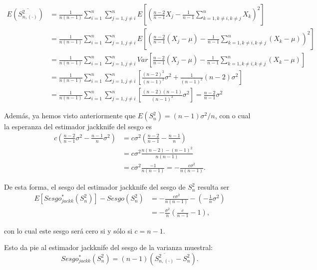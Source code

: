 \documentclass[
]{book}
\theoremstyle{break}
\theoremstyle{nonumberplain}
\begin{document}
\[\begin{aligned}
E\left( \overline{S_{n,(\cdot)}^2} \right) 
&=\frac{1}{n\left(
n-1 \right)}\sum_{i=1}^{n}\sum_{j=1,j\neq i}^{n}E\left[ \left( \frac{n-2}{n-1
}X_j-\frac{1}{n-1}\sum_{k=1,k\neq i,k\neq j}^{n}X_{k} \right)^2\right] \\
&=\frac{1}{n\left( n-1 \right)}\sum_{i=1}^{n}\sum_{j=1,j\neq i}^{n}E\left[
\left( \frac{n-2}{n-1}\left( X_j-\mu \right) -\frac{1}{n-1}\sum_{k=1,k\neq
i,k\neq j}^{n}\left( X_{k}-\mu \right) \right)^2\right] \\
&=\frac{1}{n\left( n-1 \right)}\sum_{i=1}^{n}\sum_{j=1,j\neq i}^{n}Var\left[ 
\frac{n-2}{n-1}\left( X_j-\mu \right) -\frac{1}{n-1}\sum_{k=1,k\neq
i,k\neq j}^{n}\left( X_{k}-\mu \right) \right] \\
&=\frac{1}{n\left( n-1 \right)}\sum_{i=1}^{n}\sum_{j=1,j\neq i}^{n}\left[ 
\frac{\left( n-2 \right)^2}{\left( n-1 \right)^2}\sigma^2+\frac{1}{
\left( n-1 \right)^2}\left( n-2 \right) \sigma^2\right] \\
&=\frac{1}{n\left( n-1 \right)}\sum_{i=1}^{n}\sum_{j=1,j\neq i}^{n}\left[ 
\frac{\left( n-2 \right) \left( n-1 \right)}{\left( n-1 \right)^2}\sigma
^2\right] =\frac{n-2}{n-1}\sigma^2
\end{aligned}\]

Además, ya hemos visto anteriormente que \(E\left( S_n^2 \right) = (n-1)\sigma^2/n\), con o cual la esperanza del estimador jackknife del sesgo es
\[\begin{aligned}
c\left( \frac{n-2}{n-1}\sigma^2-\frac{n-1}{n}\sigma^2 \right)
&= c\sigma^2\left( \frac{n-2}{n-1}-\frac{n-1}{n} \right) \\
&= c\sigma^2\frac{n\left( n-2 \right) -\left( n-1 \right)^2}{n\left( n-1 \right)} \\
&= c\sigma^2\frac{-1}{n\left( n-1 \right)}
=-\frac{c\sigma^2}{n\left(n-1 \right)}.
\end{aligned}\]

De esta forma, el sesgo del estimador jackknife del sesgo de \(S_n^2\)
resulta ser
\[\begin{aligned}
E\left[ Sesgo_{jackk}^{\ast}\left( S_n^2 \right) \right] 
-Sesgo\left(S_n^2 \right) &= -\frac{c\sigma^2}{n\left( n-1 \right)}
-\left( -\frac{1}{n}\sigma^2 \right) \\
&= -\frac{\sigma^2}{n}\left( \frac{c}{n-1}-1 \right),
\end{aligned}\]

con lo cual este sesgo será cero si y sólo si \(c=n-1\).

Esto da pie al estimador jackknife del sesgo de la varianza muestral:
\[Sesgo_{jackk}^{\ast}\left( S_n^2 \right) =\left( n-1 \right) \left( 
\overline{S_{n,(\cdot)}^2}-S_n^2 \right).\]
\end{document}
